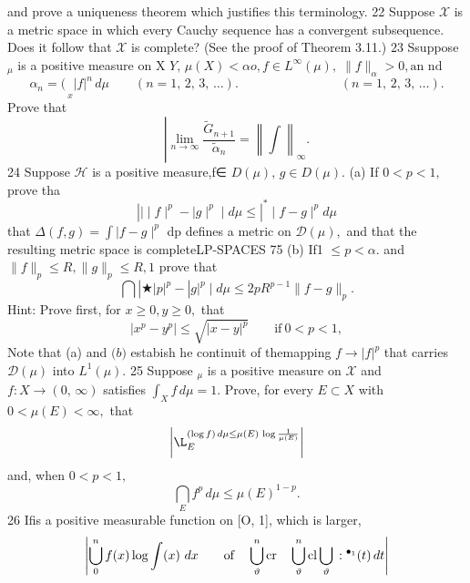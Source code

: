 and prove a uniqueness theorem which justifies this terminology. 22 Suppose $\scriptstyle{\mathcal{X}}$ is a metric space in which every Cauchy sequence has a convergent subsequence. Does it follow that $\scriptstyle{\mathcal{X}}$ is complete? (See the proof of Theorem 3.11.) $23$ Ssuppose ${}_{\!\mu}$ is a positive measure on X $Y,\,\mu(X)<\alpha o,f\in L^{\infty}(\mu),\;\|f\|_{\alpha}>0,\mathrm{an}$ nd $$ \alpha_{n}= (\frac{}{}_{x}\vert f\vert^{n}\,d\mu\qquad(n=1,\,2,\,3,\,\ldots).\qquad\qquad\qquad\qquad(n=1,\,2,\,3,\,\ldots). $$ Prove that $$ \left|\operatorname*{lim}_{n\rightarrow\infty}\frac{\tilde{G}_{n+1}}{\tilde{\alpha}_{n}}=\left\|\int\right\|_{\infty}. $$ 24 Suppose $\mathcal{H}$ is a positive measure,f∈ $D(\mu),\,g\in D(\mu).$ (a) If $0<p<1,$ prove tha $$ \left|\mid\mid f\mid^{p}-\mid g\mid^{p}\mid d\mu\leq\right|^{*}\mid f-g\mid^{p}d\mu $$ that $\Delta(f,g)=\int\mid f-g\mid^{p}$ dp defines a metric on ${\mathcal{D}}(\mu),$ and that the resulting metric space is completeLP-SPACES 75 (b) If1 $\leq p<\alpha.$ and $\|f\|_{p}\leq R,\|g\|_{p}\leq R,1$ prove that $$ \bigcap|\bigstar\left|p\right|^{p}-|g|^{p}\mid d\mu\leq2p R^{p-1}\|f-g\|_{p}. $$ Hint: Prove first, for $x\geq0,y\geq0,$ that $$ |x^{p}-y^{p}|\leq{\sqrt{|x-y|^{p}}}\qquad{{\mathrm{if~}}0<p<1,} $$ Note that (a) and ${\mathfrak{(}}b{\mathfrak{)}}$ estabish he continuit of themapping $f\to|f|^{p}$ that carries ${\mathcal{D}}(\mu)$ into $L^{1}(\mu).$ 25 Suppose ${}_{\!\mu}$ is a positive measure on $\scriptstyle{\mathcal{X}}$ and $f\colon X\to(0,\,\infty)$ satisfies $\textstyle{\int_{X}f\,d\mu=1.}$ Prove, for every $E\subset X$ with $0<\mu(E)<\infty,$ that $$ \left\vert\L_{E}^{(\log f)\,d\mu\leq\mu(E)\,\log\frac{1}{\mu(E)}}\right\vert $$ and, when $0<p<1,$ $$ \bigcap_{E}f^{p}\,d\mu\leq\mu(E)^{1-p}. $$ 26 Ifis a positive measurable function on [O, 1], which is larger, $$ \left|\bigcup_{0}^{n}f(x)\log\int(x)\ d x\qquad{\mathrm{of}}\quad\bigcup_{\vartheta}^{n}\operatorname{cr}\quad\bigcup_{\vartheta}^{n}\operatorname{cl}\bigcup_{\vartheta}\\:{}^{\bullet_{1}}(t)\,d t\right| $$